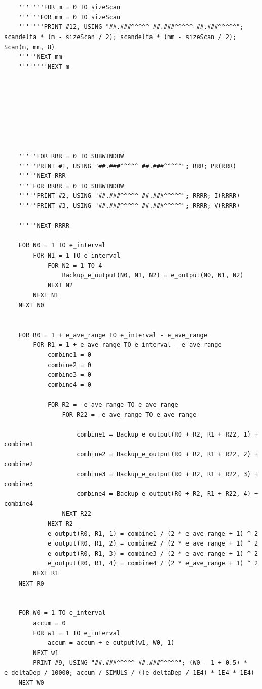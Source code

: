 \documentclass[10pt, reqno]{exam}
\begin{document}
\begin{verbatim}
    
    
    '''''''FOR m = 0 TO sizeScan
    ''''''FOR mm = 0 TO sizeScan
    '''''''PRINT #12, USING "##.###^^^^^ ##.###^^^^^ ##.###^^^^^"; scandelta * (m - sizeScan / 2); scandelta * (mm - sizeScan / 2); Scan(m, mm, 8)
    '''''NEXT mm
    ''''''''NEXT m
    
    
    
    
    
    
    
    
    '''''FOR RRR = 0 TO SUBWINDOW
    '''''PRINT #1, USING "##.###^^^^^ ##.###^^^^^"; RRR; PR(RRR)
    '''''NEXT RRR
    ''''FOR RRRR = 0 TO SUBWINDOW
    '''''PRINT #2, USING "##.###^^^^^ ##.###^^^^^"; RRRR; I(RRRR)
    '''''PRINT #3, USING "##.###^^^^^ ##.###^^^^^"; RRRR; V(RRRR)
    
    '''''NEXT RRRR
    
    FOR N0 = 1 TO e_interval
        FOR N1 = 1 TO e_interval
            FOR N2 = 1 TO 4
                Backup_e_output(N0, N1, N2) = e_output(N0, N1, N2)
            NEXT N2
        NEXT N1
    NEXT N0
    
    
    FOR R0 = 1 + e_ave_range TO e_interval - e_ave_range
        FOR R1 = 1 + e_ave_range TO e_interval - e_ave_range
            combine1 = 0
            combine2 = 0
            combine3 = 0
            combine4 = 0
    
            FOR R2 = -e_ave_range TO e_ave_range
                FOR R22 = -e_ave_range TO e_ave_range
    
                    combine1 = Backup_e_output(R0 + R2, R1 + R22, 1) + combine1
                    combine2 = Backup_e_output(R0 + R2, R1 + R22, 2) + combine2
                    combine3 = Backup_e_output(R0 + R2, R1 + R22, 3) + combine3
                    combine4 = Backup_e_output(R0 + R2, R1 + R22, 4) + combine4
                NEXT R22
            NEXT R2
            e_output(R0, R1, 1) = combine1 / (2 * e_ave_range + 1) ^ 2
            e_output(R0, R1, 2) = combine2 / (2 * e_ave_range + 1) ^ 2
            e_output(R0, R1, 3) = combine3 / (2 * e_ave_range + 1) ^ 2
            e_output(R0, R1, 4) = combine4 / (2 * e_ave_range + 1) ^ 2
        NEXT R1
    NEXT R0
    
    
    FOR W0 = 1 TO e_interval
        accum = 0
        FOR w1 = 1 TO e_interval
            accum = accum + e_output(w1, W0, 1)
        NEXT w1
        PRINT #9, USING "##.###^^^^^ ##.###^^^^^"; (W0 - 1 + 0.5) * e_deltaDep / 10000; accum / SIMULS / ((e_deltaDep / 1E4) * 1E4 * 1E4)
    NEXT W0
    

\end{verbatim}
\end{document}
